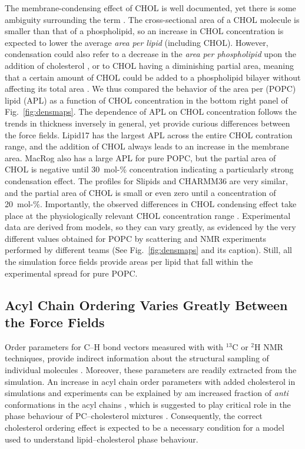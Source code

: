 \documentclass[journal=jctcce]{achemso}
\begin{document}
The membrane-condensing effect of CHOL is well documented, yet there is some ambiguity surrounding the term \cite{edholm2005areas}. The cross-sectional area of a CHOL molecule is smaller than that of a phospholipid, so an increase in CHOL concentration is expected to lower the average \emph{area per lipid} (including CHOL). However, condensation could also refer to a decrease in the \emph{area per phospholipid} upon the addition of cholesterol \cite{edholm2005areas}, or to CHOL having a diminishing partial area, meaning that a certain amount of CHOL could be added to a phospholipid bilayer without affecting its total area \cite{javanainen2017two}. We thus compared the behavior of the area per (POPC) lipid (APL) as a function of CHOL concentration in the bottom right panel of Fig.~\ref{fig:densmaps}. The dependence of APL on CHOL concentration follows the trends in thickness inversely in general, yet provide curious differences between the force fields. Lipid17 has the largest APL across the entire CHOL contration range, and the addition of CHOL always leads to an increase in the membrane area. MacRog also has a large APL for pure POPC, but the partial area of CHOL is negative until 30~mol-\% concentration indicating a particularly strong condensation effect. The profiles for Slipids and CHARMM36 are very similar, and the partial area of CHOL is small or even zero until a concentration of 20~mol-\%. Importantly, the observed differences in CHOL condensing effect take place at the physiologically relevant CHOL concentration range \cite{van2008membrane}. Experimental data are derived from models, so they can vary greatly, as evidenced by the very different values obtained for POPC by scattering and NMR experiments performed by different teams (See Fig.~\ref{fig:densmaps} and its caption). Still, all the simulation force fields provide areas per lipid that fall within the experimental spread for pure POPC.

\subsection{Acyl Chain Ordering Varies Greatly Between the Force Fields}

Order parameters for C--H bond vectors measured with with $^{13}$C or $^{2}$H NMR techniques, provide indirect information about the structural sampling of individual molecules \cite{ollila16}. Moreover, these parameters are readily extracted from the simulation. An increase in acyl chain order parameters with added cholesterol in simulations and experiments can be explained by am increased fraction of \textit{anti} conformations in the acyl chains \cite{ferreira13,??}, which is suggested to play critical role in the phase behaviour of PC--cholesterol mixtures \cite{ipsen87}. Consequently, the correct cholesterol ordering effect is expected to be a necessary condition for a model used to understand lipid--cholesterol phase behaviour.
\end{document}
